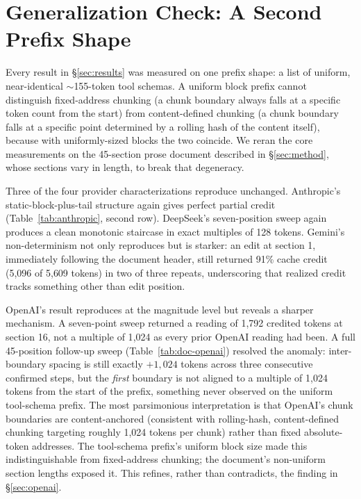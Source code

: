 \documentclass[11pt]{article}
\begin{document}
\section{Generalization Check: A Second Prefix Shape}
\label{sec:generalization}

Every result in \S\ref{sec:results} was measured on one prefix shape: a
list of uniform, near-identical $\sim$155-token tool schemas. A uniform
block prefix cannot distinguish fixed-address chunking (a chunk boundary
always falls at a specific token count from the start) from content-defined
chunking (a chunk boundary falls at a specific point determined by a
rolling hash of the content itself), because with uniformly-sized blocks
the two coincide. We reran the core measurements on the 45-section prose
document described in \S\ref{sec:method}, whose sections vary in length,
to break that degeneracy.

Three of the four provider characterizations reproduce unchanged.
Anthropic's static-block-plus-tail structure again gives perfect partial
credit (Table~\ref{tab:anthropic}, second row). DeepSeek's seven-position
sweep again produces a clean monotonic staircase in exact multiples of 128
tokens. Gemini's non-determinism not only reproduces but is starker: an
edit at section 1, immediately following the document header, still
returned 91\% cache credit (5{,}096 of 5{,}609 tokens) in two of three
repeats, underscoring that realized credit tracks something other than
edit position.

OpenAI's result reproduces at the magnitude level but reveals a sharper
mechanism. A seven-point sweep returned a reading of 1{,}792 credited
tokens at section 16, not a multiple of 1{,}024 as every prior OpenAI
reading had been. A full 45-position follow-up sweep (Table~\ref{tab:doc-openai})
resolved the anomaly: inter-boundary spacing is still exactly $+1{,}024$
tokens across three consecutive confirmed steps, but the \emph{first}
boundary is not aligned to a multiple of 1{,}024 tokens from the start of
the prefix, something never observed on the uniform tool-schema prefix. The
most parsimonious interpretation is that OpenAI's chunk boundaries are
content-anchored (consistent with rolling-hash, content-defined chunking
targeting roughly 1{,}024 tokens per chunk) rather than fixed absolute-token
addresses. The tool-schema prefix's uniform block size made this
indistinguishable from fixed-address chunking; the document's non-uniform
section lengths exposed it. This refines, rather than contradicts, the
finding in \S\ref{sec:openai}.
\end{document}
